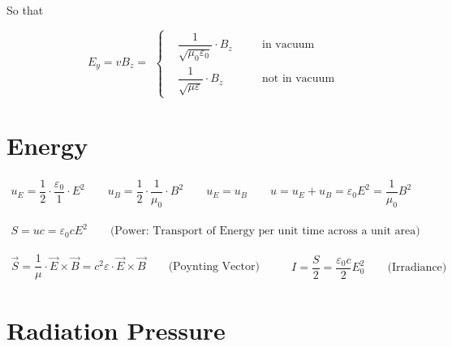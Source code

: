 So that

\begin{equation*}
  \begin{aligned}
    E_y=v B_z =
  \end{aligned}
  \left\{
  \begin{aligned}
    & \dfrac{1}{\sqrt{\mu_0 \varepsilon_0}} \cdot B_z && \quad \text{in vacuum} \\
    & \dfrac{1}{\sqrt{\mu \varepsilon}} \cdot B_z && \quad \text{not in vacuum}
  \end{aligned}
  \right.
\end{equation*}

\section{Energy}

\begin{equation*}
  \begin{aligned}
    u_{E} = \dfrac{1}{2} \cdot \dfrac{\varepsilon_0}{1} \cdot E^{2} \quad\quad 
    u_{B} = \dfrac{1}{2} \cdot \dfrac{1}{\mu_0} \cdot  B^{2} \quad\quad 
    u_{E} = u_{B} \quad\quad 
    u = u_{E} + u_{B} = \varepsilon_{0} E^{2} = \dfrac{1}{\mu_{0}} B^{2}
  \end{aligned}
\end{equation*}

\begin{equation*}
  \begin{aligned}
    S = uc = \varepsilon_0 c E^2 \quad\quad \text{(Power: Transport of Energy per unit time across a unit area)}
  \end{aligned}
\end{equation*}

\begin{equation*}
  \begin{aligned}
    \vec{S} = \dfrac{1}{\mu} \cdot \vec{E} \times \vec{B} = c^2 \varepsilon \cdot \vec{E} \times \vec{B} \quad\quad \text{(Poynting Vector)}
  \end{aligned}
  \quad\quad 
  \begin{aligned}
    I = \dfrac{S}{2} = \dfrac{\varepsilon_0 c}{2} E_0^2 \quad\quad \text{(Irradiance)}
  \end{aligned}
\end{equation*}

\section{Radiation Pressure}


